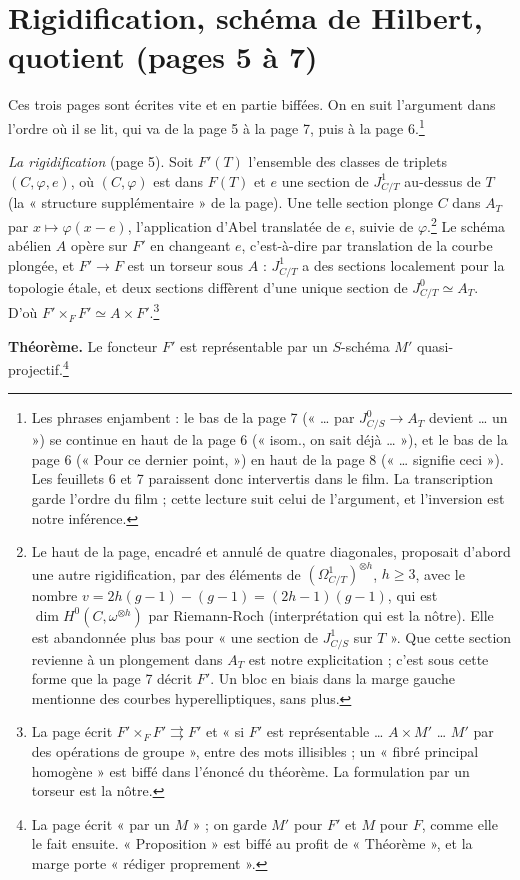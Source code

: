 \documentclass[11pt,a4paper]{article}
\begin{document}
\section*{Rigidification, schéma de Hilbert, quotient (pages 5 à 7)}

Ces trois pages sont écrites vite et en partie biffées. On en suit l'argument
dans l'ordre où il se lit, qui va de la page 5 à la page 7, puis à la page
6.\footnote{Les phrases enjambent : le bas de la page 7 (« … par
$J^{0}_{C/S} \to A_{T}$ devient … un ») se continue en haut de la page 6
(« isom., on sait déjà … »), et le bas de la page 6 (« Pour ce dernier
point, ») en haut de la page 8 (« … signifie ceci »). Les feuillets 6 et 7
paraissent donc intervertis dans le film. La transcription garde l'ordre du
film ; cette lecture suit celui de l'argument, et l'inversion est notre
inférence.}

\emph{La rigidification} (page 5). Soit $F'(T)$ l'ensemble des classes de
triplets $(C, \varphi, e)$, où $(C, \varphi)$ est dans $F(T)$ et $e$ une
section de $J^{1}_{C/T}$ au-dessus de $T$ (la « structure supplémentaire »
de la page). Une telle section plonge $C$ dans $A_{T}$ par
$x \mapsto \varphi(x - e)$, l'application d'Abel translatée de $e$, suivie de
$\varphi$.\footnote{Le haut de la page, encadré et annulé de quatre
diagonales, proposait d'abord une autre rigidification, par des éléments de
$(\Omega^{1}_{C/T})^{\otimes h}$, $h \geq 3$, avec le nombre
$v = 2h(g-1) - (g-1) = (2h-1)(g-1)$, qui est $\dim H^{0}(C,
\omega^{\otimes h})$ par Riemann-Roch (interprétation qui est la nôtre). Elle
est abandonnée plus bas pour « une section de $J^{1}_{C/S}$ sur $T$ ». Que
cette section revienne à un plongement dans $A_{T}$ est notre explicitation ;
c'est sous cette forme que la page 7 décrit $F'$. Un bloc en biais dans la
marge gauche mentionne des courbes hyperelliptiques, sans plus.}
Le schéma abélien $A$ opère sur $F'$ en changeant $e$, c'est-à-dire par
translation de la courbe plongée, et $F' \to F$ est un torseur sous $A$ :
$J^{1}_{C/T}$ a des sections localement pour la topologie étale, et deux
sections diffèrent d'une unique section de $J^{0}_{C/T} \simeq A_{T}$. D'où
$F' \times_{F} F' \simeq A \times F'$.\footnote{La page écrit
$F' \times_{F} F' \rightrightarrows F'$ et « si $F'$ est représentable …
$A \times M'$ … $M'$ par des opérations de groupe », entre des mots
illisibles ; un « fibré principal homogène » est biffé dans l'énoncé du
théorème. La formulation par un torseur est la nôtre.}

\textbf{Théorème.} Le foncteur $F'$ est représentable par un $S$-schéma $M'$
quasi-projectif.\footnote{La page écrit « par un $M$ » ; on garde $M'$ pour
$F'$ et $M$ pour $F$, comme elle le fait ensuite. « Proposition » est biffé au
profit de « Théorème », et la marge porte « rédiger proprement ».}
\end{document}
